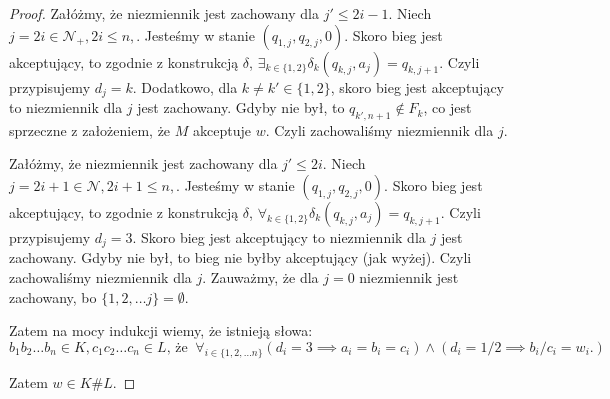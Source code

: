 \documentclass{article}
\theoremstyle{definition}
\theoremstyle{remark}
\begin{document}
\begin{proof}
    Załóżmy, że niezmiennik jest zachowany dla \(j' \leq 2i-1\). Niech \(j=2i \in \mathcal{N}_+, 2i \leq n,\). Jesteśmy w stanie \( \left(q_{1,j}, q_{2,j}, 0 \right) \).
    Skoro bieg jest akceptujący, to zgodnie z konstrukcją \(\delta\), \( \exists _{k \in \{1,2\}} \delta_k(q_{k,j}, a_j) = q_{k, j+1} \). Czyli przypisujemy \(d_j = k\).
    Dodatkowo, dla \(k \neq k' \in \{ 1, 2 \} \), skoro bieg jest akceptujący to niezmiennik dla \(j\) jest zachowany. Gdyby nie był, to
    \(q_{k',n+1} \notin F_k\), co jest sprzeczne z założeniem, że \(M\) akceptuje \(w\). Czyli zachowaliśmy niezmiennik dla \(j\).

    Załóżmy, że niezmiennik jest zachowany dla \(j' \leq 2i\). Niech \(j=2i+1 \in \mathcal{N}, 2i+1 \leq n,\). Jesteśmy w stanie \( \left(q_{1,j}, q_{2,j}, 0 \right) \).
    Skoro bieg jest akceptujący, to zgodnie z konstrukcją \(\delta\), \( \forall _{k \in \{1,2\}} \delta_k(q_{k,j}, a_j) = q_{k, j+1} \). Czyli przypisujemy \(d_j = 3\).
    Skoro bieg jest akceptujący to niezmiennik dla \(j\) jest zachowany. Gdyby nie był, to bieg nie byłby akceptujący (jak wyżej). Czyli zachowaliśmy niezmiennik dla \(j\).
    Zauważmy, że dla \(j = 0\) niezmiennik jest zachowany, bo \(\{1, 2, \ldots j\} = \emptyset\).

    Zatem na mocy indukcji wiemy, że istnieją słowa:
    \[ b_1 b_2 \ldots b_n \in K, c_1 c_2 \ldots c_n \in L \text{, że } \ \forall_{i \in \{1,2,\ldots n\}} \left( d_i = 3 \implies a_i = b_i = c_i \right) \land \left( d_i = 1/2 \implies b_i/c_i = w_i. \right) \]

    Zatem \(w \in K \# L\).

\end{proof}
\end{document}

